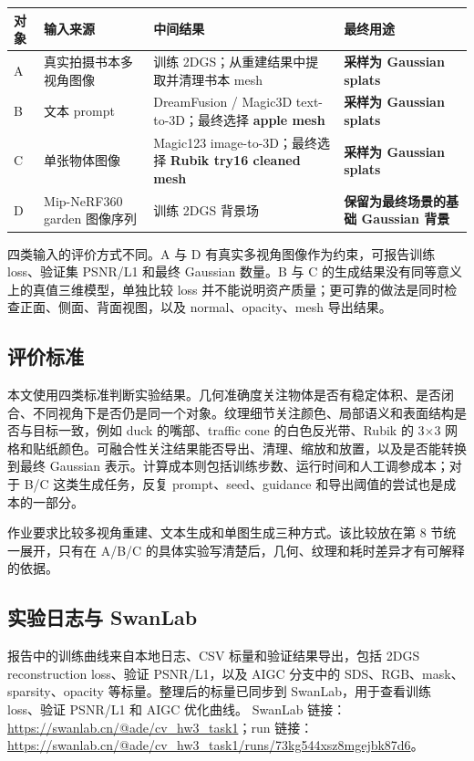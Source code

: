 \documentclass[UTF8,10pt,a4paper]{ctexart}
\let\latexcenter\center
\let\endlatexcenter\endcenter
\renewenvironment{center}{%
  \setlength{\topsep}{0.35em plus 0.08em minus 0.08em}%
  \setlength{\partopsep}{0pt}%
  \latexcenter
}{\endlatexcenter}
\begin{document}
\begin{center}
\centering
{}
\label{tab:data_sources}
\small
\begin{tabularx}{\textwidth}{p{} p{} X X}
\toprule
对象 & 输入来源 & 中间结果 & 最终用途 \\
\midrule
A & 真实拍摄书本多视角图像 & 训练 2DGS；从重建结果中提取并清理书本 mesh & \textbf{采样为 Gaussian splats} \\
B & 文本 prompt & DreamFusion / Magic3D text-to-3D；最终选择 \textbf{apple mesh} & \textbf{采样为 Gaussian splats} \\
C & 单张物体图像 & Magic123 image-to-3D；最终选择 \textbf{Rubik try16 cleaned mesh} & \textbf{采样为 Gaussian splats} \\
D & Mip-NeRF360 garden 图像序列 & 训练 2DGS 背景场 & \textbf{保留为最终场景的基础 Gaussian 背景} \\
\bottomrule
\end{tabularx}
\end{center}

四类输入的评价方式不同。A 与 D 有真实多视角图像作为约束，可报告训练 loss、验证集 PSNR/L1 和最终 Gaussian 数量。B 与 C 的生成结果没有同等意义上的真值三维模型，单独比较 loss 并不能说明资产质量；更可靠的做法是同时检查正面、侧面、背面视图，以及 normal、opacity、mesh 导出结果。

\subsection{评价标准}

本文使用四类标准判断实验结果。几何准确度关注物体是否有稳定体积、是否闭合、不同视角下是否仍是同一个对象。纹理细节关注颜色、局部语义和表面结构是否与目标一致，例如 duck 的嘴部、traffic cone 的白色反光带、Rubik 的 3$\times$3 网格和贴纸颜色。可融合性关注结果能否导出、清理、缩放和放置，以及是否能转换到最终 Gaussian 表示。计算成本则包括训练步数、运行时间和人工调参成本；对于 B/C 这类生成任务，反复 prompt、seed、guidance 和导出阈值的尝试也是成本的一部分。

作业要求比较多视角重建、文本生成和单图生成三种方式。该比较放在第 8 节统一展开，只有在 A/B/C 的具体实验写清楚后，几何、纹理和耗时差异才有可解释的依据。

\subsection{实验日志与 SwanLab}

报告中的训练曲线来自本地日志、CSV 标量和验证结果导出，包括 2DGS reconstruction loss、验证 PSNR/L1，以及 AIGC 分支中的 SDS、RGB、mask、sparsity、opacity 等标量。整理后的标量已同步到 SwanLab，用于查看训练 loss、验证 PSNR/L1 和 AIGC 优化曲线。
\noindent SwanLab 链接：\url{https://swanlab.cn/@ade/cv_hw3_task1}；run 链接：\url{https://swanlab.cn/@ade/cv_hw3_task1/runs/73kg544xsz8mgejbk87d6}。
\end{document}
